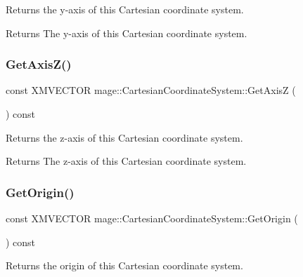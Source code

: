 Returns the y-\/axis of this Cartesian coordinate system.

\begin{DoxyReturn}{Returns}
The y-\/axis of this Cartesian coordinate system. 
\end{DoxyReturn}
\hypertarget{structmage_1_1_cartesian_coordinate_system_a9d5c1cc1fa21ea0ac79054acfb676a24}{}\label{structmage_1_1_cartesian_coordinate_system_a9d5c1cc1fa21ea0ac79054acfb676a24} 
\subsubsection{\texorpdfstring{Get\+Axis\+Z()}{GetAxisZ()}}
{\footnotesize\ttfamily const X\+M\+V\+E\+C\+T\+OR mage\+::\+Cartesian\+Coordinate\+System\+::\+Get\+AxisZ (\begin{DoxyParamCaption}{ }\end{DoxyParamCaption}) const\hspace{0.3cm}{\ttfamily [noexcept]}}

Returns the z-\/axis of this Cartesian coordinate system.

\begin{DoxyReturn}{Returns}
The z-\/axis of this Cartesian coordinate system. 
\end{DoxyReturn}
\hypertarget{structmage_1_1_cartesian_coordinate_system_add81a0efb47b0aa4084d803ba1a684e6}{}\label{structmage_1_1_cartesian_coordinate_system_add81a0efb47b0aa4084d803ba1a684e6} 
\subsubsection{\texorpdfstring{Get\+Origin()}{GetOrigin()}}
{\footnotesize\ttfamily const X\+M\+V\+E\+C\+T\+OR mage\+::\+Cartesian\+Coordinate\+System\+::\+Get\+Origin (\begin{DoxyParamCaption}{ }\end{DoxyParamCaption}) const\hspace{0.3cm}{\ttfamily [noexcept]}}

Returns the origin of this Cartesian coordinate system.

